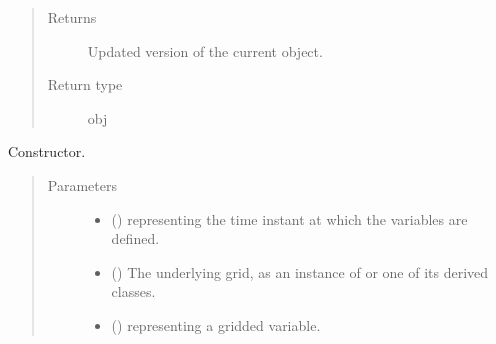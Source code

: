 \documentclass[letterpaper,10pt,english]{sphinxmanual}
\begin{document}
\begin{fulllineitems}
\begin{fulllineitems}
\begin{quote}
\begin{description}
\item[{Returns}] \leavevmode
Updated version of the current object.

\item[{Return type}] \leavevmode
obj

\end{description}\end{quote}

\end{fulllineitems}


\begin{fulllineitems}
\label{\detokenize{api:storages.grid_data.GridData.__init__}}
Constructor.
\begin{quote}\begin{description}
\item[{Parameters}] \leavevmode\begin{itemize}
\item {} 
 () \textendash{}  representing the time instant at which the variables are defined.

\item {} 
 () \textendash{} The underlying grid, as an instance of {\hyperref[\detokenize{api:grids.grid_xyz.GridXYZ}]{}} or one of its derived classes.

\item {} 
 () \textendash{}  representing a gridded variable.

\end{itemize}

\end{description}\end{quote}

\end{fulllineitems}



\end{fulllineitems}
\end{document}
